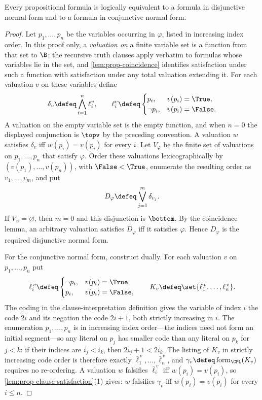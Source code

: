 \begin{theorem}
\label{thm:prop-normal-forms}
Every propositional formula is logically equivalent to a formula in
disjunctive normal form and to a formula in conjunctive normal form.
\end{theorem}
\begin{proof}
Let \(p_1,\ldots,p_n\) be the variables occurring in \(\varphi\), listed in
increasing index order.  In this
proof only, a \emph{valuation on} a finite variable set is a function from
that set to \(\B\); the recursive truth clauses apply verbatim to formulas
whose variables lie in the set, and \cref{lem:prop-coincidence} identifies
satisfaction under such a function with satisfaction under any total
valuation extending it.  For each
valuation \(v\) on these variables define
\[
  \delta_v\defeq\bigwedge_{i=1}^{n}\ell_i^v,
  \qquad
  \ell_i^v\defeq
  \begin{cases}
    p_i,&v(p_i)=\True,\\
    \neg p_i,&v(p_i)=\False.
  \end{cases}
\]
A valuation on the empty variable set is the empty function, and when
\(n=0\) the displayed conjunction is \(\topv\) by the preceding convention.
A valuation \(w\) satisfies \(\delta_v\) iff \(w(p_i)=v(p_i)\) for every
\(i\).  Let \(V_{\varphi}\) be the finite set of valuations on
\(p_1,\ldots,p_n\) that satisfy \(\varphi\).  Order these valuations
lexicographically by
\((v(p_1),\ldots,v(p_n))\), with \(\False<\True\), enumerate the resulting
order as \(v_1,\ldots,v_m\), and put
\[
  D_{\varphi}\defeq\bigvee_{j=1}^{m}\delta_{v_j}.
\]
If \(V_{\varphi}=\varnothing\), then \(m=0\) and this disjunction is
\(\bottom\).  By the
coincidence lemma, an arbitrary valuation satisfies \(D_{\varphi}\) iff
it satisfies \(\varphi\).  Hence \(D_{\varphi}\) is the required
disjunctive normal form.

For the conjunctive normal form, construct dually.  For each valuation
\(v\) on \(p_1,\ldots,p_n\) put
\[
  \bar\ell^{\,v}_i\defeq
  \begin{cases}
    \neg p_i,&v(p_i)=\True,\\
    p_i,&v(p_i)=\False,
  \end{cases}
  \qquad
  K_v\defeq\set{\bar\ell^{\,v}_1,\ldots,\bar\ell^{\,v}_n}.
\]
The coding in the clause-interpretation definition gives the variable of
index \(i\) the code \(2i\) and its negation the code \(2i+1\), both
strictly increasing in \(i\).  The enumeration \(p_1,\ldots,p_n\) is in
increasing index order---the indices need not form an initial
segment---so any literal on \(p_j\) has smaller code than any literal on
\(p_k\) for \(j<k\): if their indices are \(i_j<i_k\), then
\(2i_j+1<2i_k\).  The listing of \(K_v\) in strictly increasing code order
is therefore exactly \(\bar\ell^{\,v}_1,\ldots,\bar\ell^{\,v}_n\), and
\(\gamma_v\defeq\operatorname{form}_{\CPL}(K_v)\) requires no
re-ordering.  A valuation \(w\) falsifies \(\bar\ell^{\,v}_i\) iff
\(w(p_i)=v(p_i)\), so \cref{lem:prop-clause-satisfaction}(1) gives:
\(w\) falsifies \(\gamma_v\) iff \(w(p_i)=v(p_i)\) for every
\(i\leq n\).


\end{proof}

